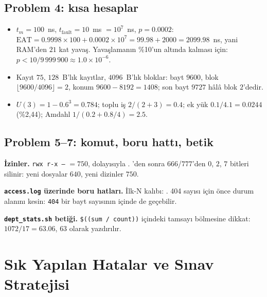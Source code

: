 \subsection{Problem 4: kısa hesaplar}
\begin{itemize}
  \item $t_m = 100$~ns, $t_{\text{fault}} = 10$~ms $= 10^{7}$~ns, $p = 0.0002$: $\text{EAT} = 0.9998 \times 100 + 0.0002 \times 10^{7} = 99.98 + 2000 = 2099.98$~ns, yani RAM'den $21$ kat yavaş. Yavaşlamanın \%10'un altında kalması için: $p < 10/9\,999\,900 \approx 1.0\times10^{-6}$.
  \item Kayıt $75$, $128$~B'lık kayıtlar, $4096$~B'lık bloklar: bayt $9600$, blok $\lfloor 9600/4096 \rfloor = 2$, konum $9600 - 8192 = 1408$; son bayt $9727$ hâlâ blok $2$'dedir.
  \item $U(3) = 1 - 0.6^{3} = 0.784$; toplu iş $2/(2+3) = 0.4$; ek yük $0.1/4.1 = 0.0244$ (\%2,44); Amdahl $1/(0.2 + 0.8/4) = 2.5$.
\end{itemize}

\subsection{Problem 5--7: komut, boru hattı, betik}
\textbf{İzinler.} \texttt{rwx r-x ---} $= 750$, dolayısıyla . 'den sonra $666$/$777$'den $0$, $2$, $7$ bitleri silinir: yeni dosyalar $640$, yeni dizinler $750$.

\textbf{\texttt{access.log} üzerinde boru hatları.} İlk-N kalıbı: . 404 sayısı için önce durum alanını kesin: \texttt{404} bir bayt sayısının içinde de geçebilir.

\textbf{\texttt{dept\_stats.sh} betiği.} \texttt{\$((sum / count))} içindeki tamsayı bölmesine dikkat: $1072/17 = 63.06$, $63$ olarak yazdırılır.



\section{Sık Yapılan Hatalar ve Sınav Stratejisi}
\label{sec:mistakes}

